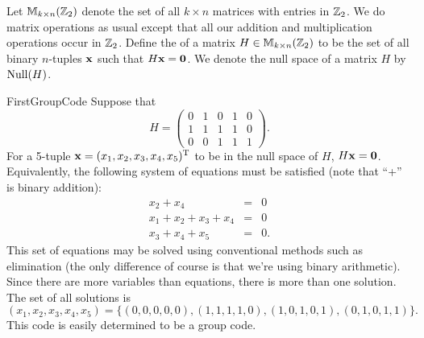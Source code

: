 \begin{defn} 
Let ${\Bbb M}_{k \times n}({\Bbb Z}_2)$ denote the set
of all $k \times n$ matrices with entries in ${\Bbb Z}_2$. We do
matrix operations as usual except that all our addition and multiplication
operations occur in ${\Bbb Z}_2$. Define the  of 
a matrix $H \in {\Bbb M}_{k \times n}({\Bbb Z}_2)$ to be the set of
all binary $n$-tuples ${\bold x}$ such that $H{\bold x} = {\bold 0}$.
We denote the null space of a matrix $H$ by ${\rm Null}(H)$.  
\end{defn} 
 
\begin{example}{FirstGroupCode}
Suppose that
\[
H =
\left(
\begin{array}{ccccc}
0 & 1 & 0 & 1 & 0 \\
1 & 1 & 1 & 1 & 0 \\
0 & 0 & 1 & 1 & 1
\end{array}
\right).
\]
For a 5-tuple ${\bold x} = (x_1, x_2, x_3, x_4, x_5)^{\rm T}$ to be in
the null space of $H$, $H{\bold x} = {\bold 0}$. Equivalently, the
following system of equations must be satisfied (note that ``+'' is binary addition):   
\begin{eqnarray*}
 x_2 + x_4   & = & 0 \\
x_1 + x_2 + x_3 + x_4  & = & 0 \\
 x_3 + x_4 + x_5 & = & 0.
\end{eqnarray*}
This set of equations may be solved using conventional methods such as elimination (the only difference of course is that we're using binary arithmetic). Since there are more variables than equations, there is more than one solution. The set of all solutions is
\[
(x_1,x_2,x_3,x_4,x_5) = \{(0,0,0,0,0),(1,1,1,1,0), (1,0,1,0,1), (0,1,0,1,1)\}.
\]
This code is easily determined to be a group code.
\end{example}

